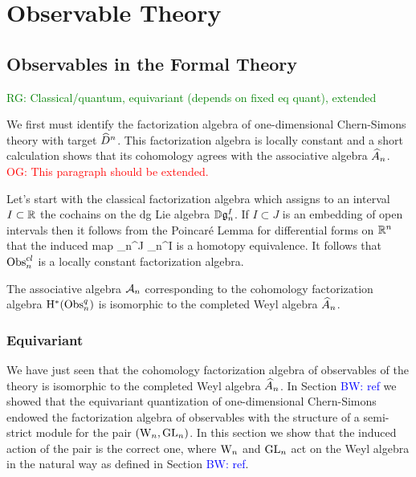 \documentclass[10pt]{amsart}
\def\brian{\textcolor{blue}{BW: }\textcolor{blue}}
\def\owen{\textcolor{red}{OG: }\textcolor{red}}
\def\ryan{\textcolor{green}{RG: }\textcolor{green}}
\def\hA{\Hat{A}}
\begin{document}
\section{Observable Theory}


\subsection{Observables in the Formal Theory}

\ryan{Classical/quantum, equivariant (depends on fixed eq quant), extended}


We first must identify the factorization algebra of one-dimensional
Chern-Simons theory with target $\widehat{D}^n$. This factorization algebra is
locally constant and a short calculation shows that its cohomology
agrees with the associative algebra $\hA_n$.
\owen{This paragraph should be extended.}

Let's start with the classical factorization algebra which assigns to
an interval $I \subset \mathbb R$ the cochains on the dg Lie algebra $\mathbb D
\mathfrak g_n^I$. If $I \subset J$ is an embedding of open intervals then it
follows from the Poincar\'{e} Lemma for differential forms on $\mathbb R^n$
that the induced map
\ben
\fg_n^J \xto{\simeq} \fg_n^I
\een
is a homotopy equivalence. It follows that ${\rm Obs}^{cl}_n$ is a locally
constant factorization algebra. 




\begin{prop} The associative algebra $\mathcal{A}_n$ corresponding to the
  cohomology factorization algebra ${\rm H}^*({\rm Obs}^q_n)$ is isomorphic
  to the completed Weyl algebra $\hA_n$. 
\end{prop}



\subsubsection{Equivariant}

We have just seen that the cohomology factorization algebra of
observables of the
theory is isomorphic to the completed Weyl algebra $\hA_n$. In Section
\brian{ref} we showed that the equivariant quantization of
one-dimensional Chern-Simons endowed the factorization algebra of
observables with the structure of a semi-strict module for the pair
$({{\rm W}_n}, {\rm GL}_n)$. In this section we show that the induced action of
the pair is the correct one, where ${{\rm W}_n}$ and ${\rm GL}_n$ act on the Weyl
algebra in the natural way as defined in Section \brian{ref}. 
\end{document}
